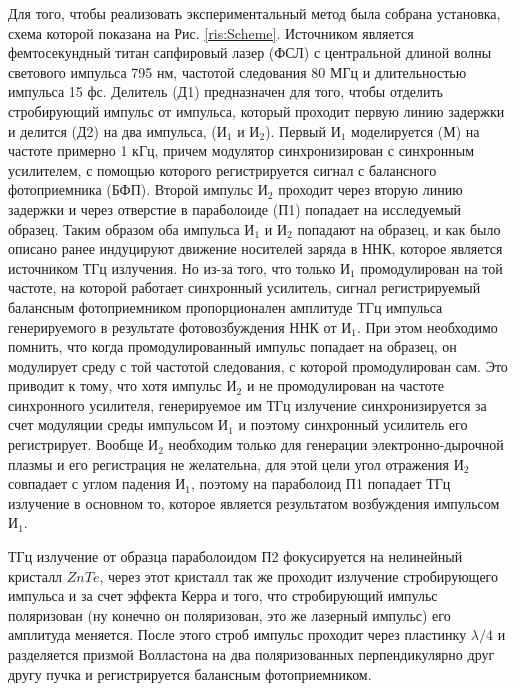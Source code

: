 \documentclass[a4paper,14pt,russian]{extreport}
\begin{document}
			Для того, чтобы реализовать экспериментальный метод была собрана установка, схема которой показана на Рис.  \ref{ris:Scheme}. Источником является фемтосекундный титан сапфировый лазер (ФСЛ) с центральной длиной волны светового импульса 795 нм, частотой следования 80 МГц и длительностью импульса 15 фс. Делитель (Д1) предназначен для того, чтобы отделить стробирующий импульс от импульса, который проходит первую линию задержки и делится (Д2) на два импульса, ($\text{И}_1$ и $\text{И}_2$). Первый $\text{И}_1$ моделируется (М) на частоте примерно 1 кГц, причем модулятор синхронизирован с синхронным усилителем, с помощью которого регистрируется сигнал с балансного фотоприемника (БФП). Второй импульс $\text{И}_2$ проходит через вторую линию задержки и через отверстие в параболоиде (П1) попадает на исследуемый образец. Таким образом оба импульса $\text{И}_1$ и $\text{И}_2$ попадают на образец, и как было описано ранее индуцируют движение носителей заряда в ННК, которое является источником ТГц излучения. Но из-за того, что только $\text{И}_1$ промодулирован на той частоте, на которой работает синхронный усилитель, сигнал регистрируемый балансным фотоприемником пропорционален амплитуде ТГц импульса генерируемого в результате фотовозбуждения ННК от $\text{И}_1$. При этом необходимо помнить, что когда промодулированный импульс попадает на образец, он модулирует среду с той частотой следования, с которой промодулирован сам. Это приводит к тому, что хотя импульс $\text{И}_2$ и не промодулирован на частоте синхронного усилителя, генерируемое им ТГц излучение синхронизируется за счет модуляции среды импульсом $\text{И}_1$ и поэтому синхронный усилитель его регистрирует. Вообще $\text{И}_2$ необходим только для генерации электронно-дырочной плазмы и его регистрация не желательна, для этой цели угол отражения $\text{И}_2$ совпадает с углом падения $\text{И}_1$, поэтому на параболоид П1 попадает ТГц излучение в основном то, которое является результатом возбуждения импульсом $\text{И}_1$.\par
			ТГц излучение от образца параболоидом П2 фокусируется на нелинейный кристалл $ZnTe$, через этот кристалл так же проходит излучение стробирующего импульса и за счет эффекта Керра и того, что стробирующий импульс поляризован (ну конечно он поляризован, это же лазерный импульс) его амплитуда меняется. После этого строб импульс проходит через пластинку $\lambda/4$ и разделяется призмой Волластона на два поляризованных перпендикулярно друг другу пучка и регистрируется балансным фотоприемником.\par
\end{document}
